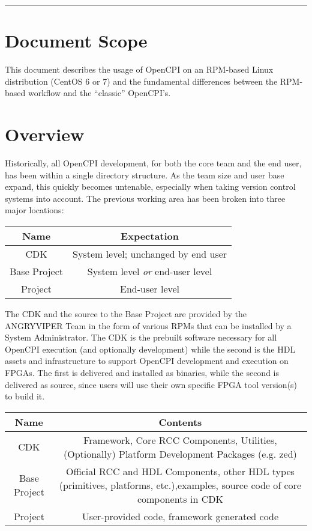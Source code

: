 \documentclass{article}
\begin{document}
\tableofcontents
\vspace{1pc}
\hrule
\section{Document Scope}
This document describes the usage of OpenCPI on an RPM-based Linux distribution (CentOS 6 or 7) and the fundamental differences between the RPM-based workflow and the ``classic'' OpenCPI's.

\section{Overview}
Historically, all OpenCPI development, for both the core team and the end user, has been within a single directory structure. As the team size and user base expand, this quickly becomes untenable, especially when taking version control systems into account. The previous working area has been broken into three major locations:

\begin{center}
\begin{tabular}{|c|c|}
\hline
\rowcolor{blue}
Name & Expectation
\\
\hline
CDK & System level; unchanged by end user
\\
\hline
Base Project & System level \textit{or} end-user level
\\
\hline
Project & End-user level
\\
\hline
\end{tabular}
\end{center}

The CDK and the source to the Base Project are provided by the ANGRYVIPER Team in the form of various RPMs that can be installed by a System Administrator. The CDK is the prebuilt software necessary for all OpenCPI execution (and optionally development) while the second is the HDL assets and infrastructure to support OpenCPI development and execution on FPGAs.  The first is delivered and installed as binaries, while the second is delivered as source, since users will use their own specific FPGA tool version(s) to build it.

\begin{center}
\begin{tabularx}{\textwidth}{|c|C|}
\hline
{}
Name & Contents\\
\hline
CDK & Framework, Core RCC Components, Utilities,\linebreak[1] (Optionally) Platform Development Packages (e.g. zed)\\
\hline
Base Project & Official RCC and HDL Components, other HDL types (primitives, platforms, etc.),\linebreak[1] examples, source code of core components in CDK\\
\hline
Project & User-provided code, framework generated code\\
\hline
\end{tabularx}
\end{center}
\end{document}
